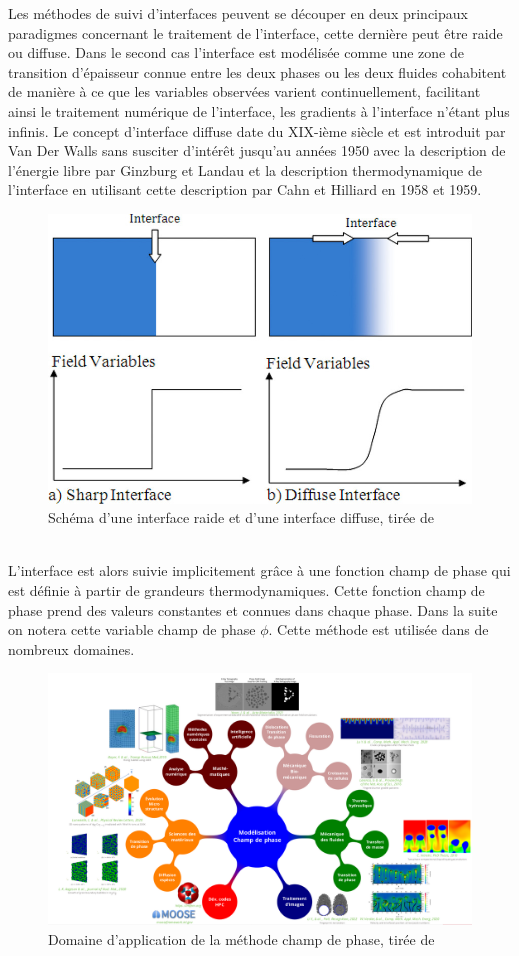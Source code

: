 \documentclass[a4paper,11pt,fleqn]{report}    %
\begin{document}
Les méthodes de suivi d'interfaces peuvent se découper en deux principaux paradigmes concernant le traitement de l'interface, cette dernière peut être raide ou diffuse. Dans le second cas l'interface est modélisée comme une zone de transition d'épaisseur connue entre les deux phases ou les deux fluides cohabitent de manière à ce que les variables observées varient continuellement, facilitant ainsi le traitement numérique de l'interface, les gradients à l'interface n'étant plus infinis. Le concept d'interface diffuse date du XIX-ième siècle et est introduit par Van Der Walls sans susciter d'intérêt jusqu'au années 1950 avec la description de l'énergie libre par Ginzburg et Landau et la description thermodynamique de l'interface en utilisant cette description par Cahn et Hilliard en 1958 et 1959.
\begin{figure}[h!]
	\centering
	\includegraphics[width=0.3\linewidth]{figure/diffuse_interface}
	\caption[Schéma d'une interface raide et d'une interface diffuse]{Schéma d'une interface raide et d'une interface diffuse, tirée de \cite{samkhaniani_evaluation_2017}}
	\label{fig:diffuseinterface}
\end{figure} \\
L'interface est alors suivie implicitement grâce à une fonction champ de phase qui est définie à partir de grandeurs thermodynamiques. Cette fonction champ de phase prend des valeurs constantes et connues dans chaque phase. Dans la suite on notera cette variable champ de phase $\phi$. Cette méthode est utilisée dans de nombreux domaines.

\begin{figure}[h!]
	\centering
	\includegraphics[width=0.9\linewidth]{figure/champ_phase}
	\caption[Domaine d'application de la méthode champ de phase]{Domaine d'application de la méthode champ de phase, tirée de \cite{introini_suivi_nodate}}
	\label{fig:champphase}
\end{figure} 
\end{document}

